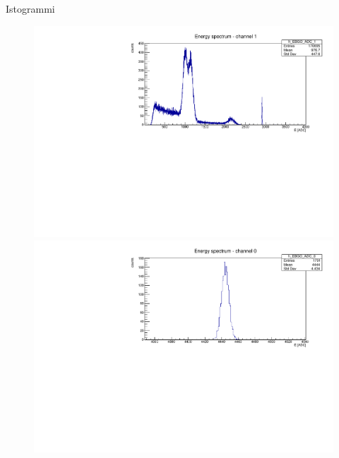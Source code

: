 \documentclass [xcolor=svgnames] {beamer}
\begin{document}
\begin{frame}{Istogrammi}
\begin{figure}
		\vspace{0.4cm} %
		
		\begin{minipage}{0.45\textwidth}
			\centering
			\includegraphics[width=\linewidth]{img/ex1777.pdf} %
		\end{minipage}
		\hfill
		\begin{minipage}{0.45\textwidth}
			\centering
			\includegraphics[width=\linewidth]{img/pulser.pdf} %
		\end{minipage}
	\end{figure}
\end{frame}

\end{document}
